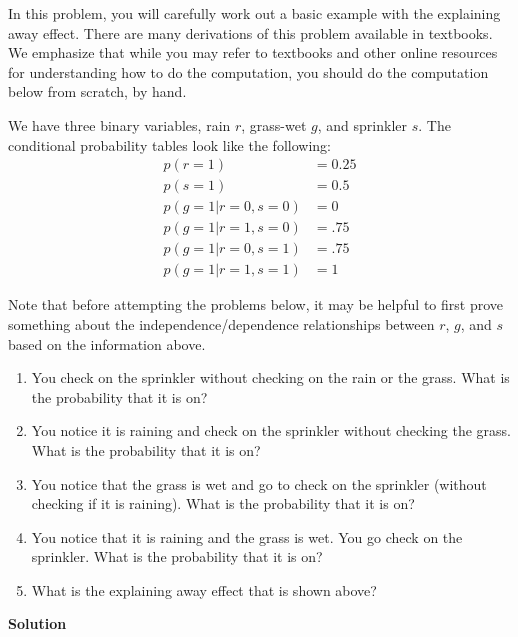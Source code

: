\documentclass[submit]{harvardml}
\begin{document}
\begin{problem}

  In this problem, you will carefully work out a basic example with
  the explaining away effect. There are many derivations of this
  problem available in textbooks. We emphasize that while you may
  refer to textbooks and other online resources for understanding how
  to do the computation, you should do the computation below from
  scratch, by hand.

  We have three binary variables, rain $r$, grass-wet $g$, and
  sprinkler $s$.  The conditional probability tables look like the
  following:
  \begin{eqnarray*}
    p(r = 1) &= 0.25 \\
    p(s = 1) &= 0.5 \\
    p(g = 1 | r = 0 , s = 0 ) &= 0 \\
    p(g = 1 | r = 1 , s = 0 ) &= .75 \\
    p(g = 1 | r = 0 , s = 1 ) &= .75 \\
    p(g = 1 | r = 1 , s = 1 ) &= 1
  \end{eqnarray*}
  
  Note that before attempting the problems below, it may be helpful to first prove
  something about the independence/dependence relationships between $r$, $g$, and $s$
  based on the information above.

  \begin{enumerate}
    \item You check on the sprinkler without checking on the rain or
      the grass. What is the probability that it is on?
    \item You notice it is raining and check on the sprinkler without
      checking the grass.  What is the probability that it is on?
    \item You notice that the grass is wet and go to check on the
      sprinkler (without checking if it is raining).  What is the
      probability that it is on?
    \item You notice that it is raining and the grass is wet.  You go
      check on the sprinkler.  What is the probability that it is on?
    \item What is the explaining away effect that is shown above?
    \end{enumerate}

\end{problem}

\textbf{Solution}
\end{document}
